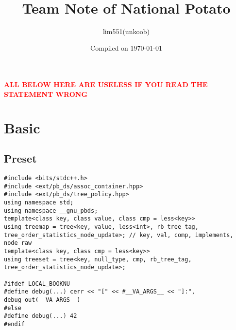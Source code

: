 \documentclass[landscape, 8pt, a4paper, oneside, twocolumn]{extarticle}
\title{Team Note of National Potato}
\author{lim551(unkoob)}
\date{Compiled on \today}
\begin{document}
{
	\Large

	\maketitle

\tableofcontents
}
\thispagestyle{fancy}
\pagebreak

\textcolor{red}{\textbf{ALL BELOW HERE ARE USELESS IF YOU READ THE STATEMENT WRONG}}

\section{Basic}
\subsection {Preset}
\begin{verbatim}
#include <bits/stdc++.h>
#include <ext/pb_ds/assoc_container.hpp>
#include <ext/pb_ds/tree_policy.hpp>
using namespace std;
using namespace __gnu_pbds;
template<class key, class value, class cmp = less<key>>
using treemap = tree<key, value, less<int>, rb_tree_tag, tree_order_statistics_node_update>; // key, val, comp, implements, node raw
template<class key, class cmp = less<key>>
using treeset = tree<key, null_type, cmp, rb_tree_tag, tree_order_statistics_node_update>;

#ifdef LOCAL_BOOKNU
#define debug(...) cerr << "[" << #__VA_ARGS__ << "]:", debug_out(__VA_ARGS__)
#else
#define debug(...) 42
#endif


\end{verbatim}
\end{document}
